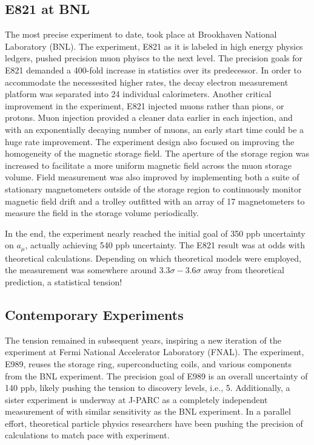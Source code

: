 \subsection{E821 at BNL}
The most precise \mugmtwo experiment to date, took place at Brookhaven National Laboratory (BNL). The experiment, E821 as it is labeled in high energy physics ledgers, pushed precision muon phyiscs to the next level.  The precision goals for E821 demanded a 400-fold increase in statistics over its predecessor.  In order to accommodate the necessesited higher rates, the decay electron measurement platform was separated into 24 individual calorimeters.  Another critical improvement in the experiment, E821 injected muons rather than pions, or protons.  Muon injection provided a cleaner data earlier in each injection, and with an exponentially decaying number of muons, an early start time could be a huge rate improvement.  The experiment design also focused on improving the homogeneity of the magnetic storage field.  The aperture of the storage region was increased to facilitate a more uniform magnetic field across the muon storage volume.  Field measurement was also improved by implementing both a suite of stationary magnetometers outside of the storage region to continuously monitor magnetic field drift and a trolley outfitted with an array of 17 magnetometers to measure the field in the storage volume periodically.  

In the end, the experiment nearly reached the initial goal of 350 ppb uncertainty on $a_\mu$, actually achieving 540 ppb uncertainty\cite{e821-prd}.  The E821 \gmtwo result was at odds with theoretical calculations.  Depending on which theoretical models were employed, the measurement was somewhere around $3.3\sigma - 3.6\sigma$ away from theoretical prediction, a statistical tension!

\subsection{Contemporary Experiments}
The tension remained in subsequent years, inspiring a new iteration of the \mugmtwo experiment at Fermi National Accelerator Laboratory (FNAL). The experiment, E989, reuses the storage ring, superconducting coils, and various components from the BNL experiment.  The precision goal of E989 is an overall uncertainty of 140 ppb, likely pushing the tension to discovery levels, i.e., \SI{5}{\sigma}. Additionally, a sister experiment is underway at J-PARC as a completely independent measurement of \mugmtwo with similar sensitivity as the BNL experiment.  In a parallel effort, theoretical particle physics researchers have been pushing the precision of calculations to match pace with experiment\cite{e989-tdr}.


